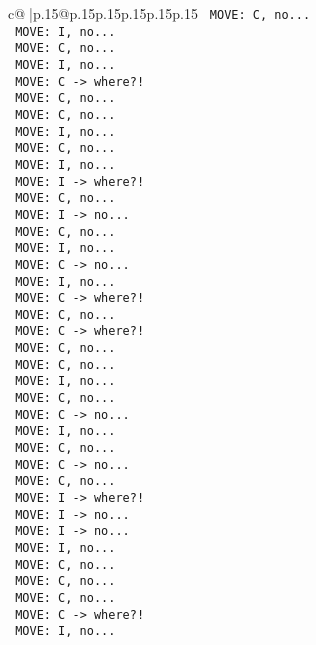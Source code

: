 \documentclass{article}
\begin{document}
{\begin{supertabular}{c@{$\;$}|p{.15\linewidth}@{}p{.15\linewidth}p{.15\linewidth}p{.15\linewidth}p{.15\linewidth}p{.15\linewidth}}
{{{\texttt{ MOVE: C, no...} \\
\texttt{ MOVE: I, no...} \\
\texttt{ MOVE: C, no...} \\
\texttt{ MOVE: I, no...} \\
\texttt{ MOVE: C {-}> where?!} \\
\texttt{ MOVE: C, no...} \\
\texttt{ MOVE: C, no...} \\
\texttt{ MOVE: I, no...} \\
\texttt{ MOVE: C, no...} \\
\texttt{ MOVE: I, no...} \\
\texttt{ MOVE: I {-}> where?!} \\
\texttt{ MOVE: C, no...} \\
\texttt{ MOVE: I {-}> no...} \\
\texttt{ MOVE: C, no...} \\
\texttt{ MOVE: I, no...} \\
\texttt{ MOVE: C {-}> no...} \\
\texttt{ MOVE: I, no...} \\
\texttt{ MOVE: C {-}> where?!} \\
\texttt{ MOVE: C, no...} \\
\texttt{ MOVE: C {-}> where?!} \\
\texttt{ MOVE: C, no...} \\
\texttt{ MOVE: C, no...} \\
\texttt{ MOVE: I, no...} \\
\texttt{ MOVE: C, no...} \\
\texttt{ MOVE: C {-}> no...} \\
\texttt{ MOVE: I, no...} \\
\texttt{ MOVE: C, no...} \\
\texttt{ MOVE: C {-}> no...} \\
\texttt{ MOVE: C, no...} \\
\texttt{ MOVE: I {-}> where?!} \\
\texttt{ MOVE: I {-}> no...} \\
\texttt{ MOVE: I {-}> no...} \\
\texttt{ MOVE: I, no...} \\
\texttt{ MOVE: C, no...} \\
\texttt{ MOVE: C, no...} \\
\texttt{ MOVE: C, no...} \\
\texttt{ MOVE: C {-}> where?!} \\
\texttt{ MOVE: I, no...} \\
}}}
\end{supertabular}}
\end{document}
